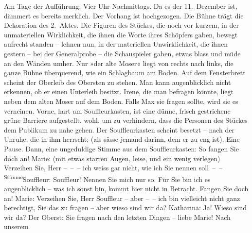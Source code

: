 \begin{ledgroupsized}[t]{13cm}
           {\bigskip}\pstart
           \noindent{}Am Tage der Aufführung. Vier Uhr Nachmittags. Da es der 11. Dezember
					ist, dämmert es bereits merklich. Der Vorhang ist hochgezogen. Die Bühne trägt
					die Dekoration des 2. Aktes.
					Die Figuren des Stückes, die noch vor kurzem, in der unmateriellen Wirklichkeit,
					die ihnen die Worte ihres Schöpfers gaben, bewegt aufrecht standen – lehnen nun,
					in der materiellen Unwirklichkeit, die ihnen gestern – bei der Generalprobe –
					die Schauspieler gaben, etwas blass und müde an den Wänden umher. Nur »der alte
					Moser« liegt von rechts nach links, die ganze Bühne überquerend, wie ein
					Schlagbaum am Boden. Auf dem Fensterbrett scheint der Oberleib des Obersten zu
					stehen. Man kann augenblicklich nicht erkennen, ob er einen Unterleib besitzt.
					Irene, die man befragen könnte, liegt neben dem alten Moser auf dem Boden. Falls
					Max sie fragen sollte, wird sie es verneinen.\pend
           \pstart
           Vorne, hart am Souffleurkasten, ist eine dünne, frisch gestrichene grüne Barriere
					aufgestellt, wohl, um zu verhindern, dass die Person\introOben{}en\introOben{}
					des Stückes dem Publikum zu nahe gehen. Der Souffleurkasten scheint besetzt –
					nach der Unruhe, die in ihm herrscht; (als sässe jemand darinn, dem
					er zu eng ist).\pend
           \pstart
           Eine Pause.\pend
           \pstart
           Dann, eine ungeduldige Stimme aus dem Souffleurkasten:\pend
           \pstart
           {\pb}So fangen Sie doch an!\pend
           \pstart
           Marie: (mit etwas starren Augen, leise, und ein wenig verlegen) Verzeihen Sie,
					Herr – – – ich weiss gar nicht, wie ich Sie nennen soll – –\pend
           \pstart
           \substVorne{}\textsuperscript{Stimme}{\allowbreak}\substDazwischen{}Souffleur\substHinten{}: Souffleur! Nennen Sie mich nur so. Für Sie bin ich es augenblicklich –
					was ich sonst bin, kommt hier nicht in Betracht. Fangen Sie doch an!\pend
           \pstart
           Marie: Verzeihen Sie, Herr Souffleur – aber – – ich bin vielleicht nicht
					ganz berechtigt, Sie das zu fragen – aber wieso sind wir da?\pend
           \pstart
           Katharina: Ja! Wieso sind wir da?\pend
           \pstart
           Der Oberst: Sie fragen nach den letzten Dingen – liebe Marie! Nach unserem

\end{ledgroupsized}
